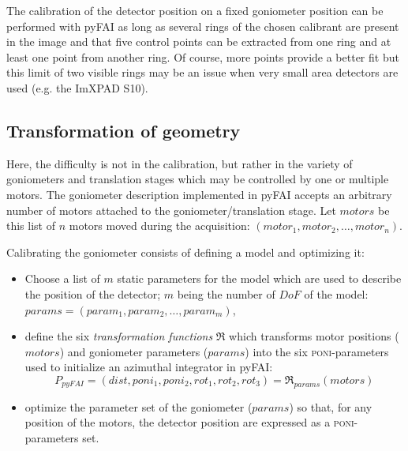 \documentclass[preprint]{iucr}              %
\begin{document}
The calibration of the detector position on a fixed goniometer position can be
performed with pyFAI as long as several rings of the chosen calibrant are
present in the image and that five control points can be extracted from one
ring and at least one point from another ring. 
Of course, more points provide a better fit but this limit of two visible rings 
may be an issue when very small area detectors are used (e.g. the ImXPAD S10).

\subsection{Transformation of geometry}

Here, the difficulty is not in the calibration, but rather in the
variety of goniometers and translation stages which may be controlled by one or 
multiple motors.
The goniometer description implemented in pyFAI accepts an
arbitrary number of motors attached to the goniometer/translation stage. 
Let $motors$ be this list of $n$ motors moved during the acquisition: 
$(motor_1, motor_2, \ldots, motor_n)$. 

Calibrating the goniometer consists of defining a model and optimizing it:
\begin{itemize}
  \item Choose a list of $m$ static parameters for the model which are used to describe the position of the detector;
  $m$ being the number of $DoF$ of the model:
  $params = (param_1, param_2, \ldots, param_m)$,
  \item define the six \textit{transformation functions} $\Re$ which transforms motor positions ($motors$)
  and goniometer parameters ($params$) into the six \textsc{poni}-parameters used to
  initialize an azimuthal integrator in pyFAI:
\begin{equation}
P_{pyFAI} = (dist, poni_1, poni_2, rot_1, rot_2, rot_3) = \Re_{params}(motors)
\end{equation}
  \item optimize the parameter set of the goniometer ($params$) so that,
  for any position of the motors, the detector position are expressed as
  a \textsc{poni}-parameters set.
\end{itemize}

\end{document}
